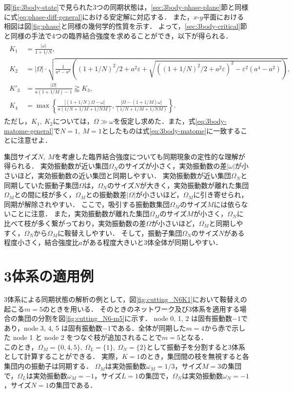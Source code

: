 \documentclass[../main]{subfiles}
\begin{document}
図\ref{fig:3body-state}で見られた3つの同期状態は，\ref{sec:3body-phase-plane}節と同様に式\eqref{eq:phase-diff-general}における安定解に対応する．
また，$x$-$y$平面における相図は図\ref{fig:phase}と同様の幾何学的性質を示す．
よって，\ref{sec:3body-critical}節と同様の手法で4つの臨界結合強度を求めることができ，以下が得られる．
\begin{align}
    \label{eq:3body-matome-general}
    \begin{split}
        K_1&=\frac{|\omega|}{1+1/N},\\
        K_2&=|\Omega|\cdot\sqrt{\frac{1}{a^4-a^2}\left((1+1/N)^2/2+a^2\varepsilon+\sqrt{((1+1/N)^2/2+a^2\varepsilon)^2-\varepsilon^2(a^4-a^2)}\right)},\\
        K'_3&=\frac{|\Omega|}{a(1+1/M)-1}\gtrapprox K_3,\\
        K_4&=\max\left\{\frac{|(1+1/N)\Omega-\omega|}{a(1/N+1/M+1/NM)},\frac{|\Omega-(1+1/M)\omega|}{(1/N+1/M+1/NM)}\right\}.
    \end{split}
\end{align}
ただし，$K_1,\ K_2$については，$\Omega\gg\omega$を仮定し求めた．また，式\eqref{eq:3body-matome-general}で$N=1,\ M=1$としたものは式\eqref{eq:3body-matome}に一致することに注意せよ．

集団サイズ$N,\ M$を考慮した臨界結合強度についても同期現象の定性的な理解が得られる．
実効振動数が近い集団$\Omega_N$のサイズが小さく，実効振動数の差$|\omega|$が小さいほど，実効振動数の近い集団と同期しやすい．
実効振動数が近い集団$\Omega_N$と同期していた振動子集団$\Omega$は，$\Omega_N$のサイズ$N$が大きく，実効振動数が離れた集団$\Omega_M$との間に枝が多く，$\Omega_M$との振動数差$|\Omega|$が小さいほど，$\Omega_M$に引き寄せられ，同期が解除されやすい．
ここで，吸引する振動数集団$\Omega_M$のサイズ$M$には依らないことに注意．
また，実効振動数が離れた集団$\Omega_M$のサイズ$M$が小さく，$\Omega_N$に比べて枝が多く繋がっており，実効振動数の差$\Omega$が小さいほど，$\Omega_M$と同期しやすく，$\Omega_N$から$\Omega_M$に鞍替えしやすい．
そして，振動子集団$\Omega_N$のサイズ$N$がある程度小さく，結合強度比$a$がある程度大きいと3体全体が同期しやすい．

\section{3体系の適用例}
3体系による同期状態の解析の例として，図\ref{fig:cutting_N6K1}において鞍替えの起こる$m=5$のときを用いる．
そのときのネットワーク及び3体系を適用する場合の集団の分割を図\ref{fig:cutting_N6-m5}に示す．
node 0, 1, 2 は固有振動数$-1$であり，node 3, 4, 5 は固有振動数$-1$である．全体が同期した$m=4$から赤で示した node 1 と node 2 をつなぐ枝が追加されることで$m=5$となる．\\
このとき，$\Omega_M=\{0,4,5\},\ \Omega_L=\{1\},\ \Omega_N=\{2\}$として振動子を分割すると3体系として計算することができる．
実際，$K=1$のとき，集団間の枝を無視すると各集団内の振動子は同期する．
$\Omega_M$は実効振動数$\omega_M=1/3$，サイズ$M=3$の集団で，$\Omega_L$は実効振動数$\omega_M=-1$，サイズ$L=1$の集団で，$\Omega_N$は実効振動数$\omega_N=-1$，サイズ$N=1$の集団である．
\end{document}
